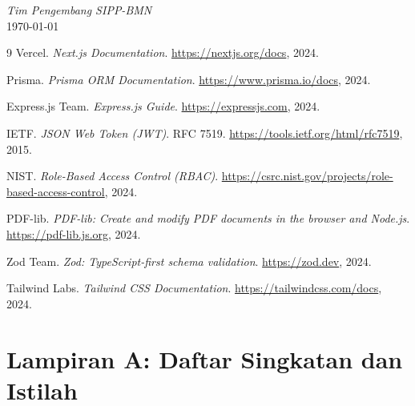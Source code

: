 \documentclass[
  12pt,
  a4paper,
  oneside,
  final
]{report}
\begin{document}
\begin{flushright}
  \textit{Tim Pengembang SIPP-BMN} \\[4pt]
  \today
\end{flushright}

\clearpage
{}

\begin{thebibliography}{9}
    Vercel. \textit{Next.js Documentation}.
    \url{https://nextjs.org/docs}, 2024.

    Prisma. \textit{Prisma ORM Documentation}.
    \url{https://www.prisma.io/docs}, 2024.

    Express.js Team. \textit{Express.js Guide}.
    \url{https://expressjs.com}, 2024.

    IETF. \textit{JSON Web Token (JWT)}.
    RFC 7519. \url{https://tools.ietf.org/html/rfc7519}, 2015.

    NIST. \textit{Role-Based Access Control (RBAC)}.
    \url{https://csrc.nist.gov/projects/role-based-access-control}, 2024.

    PDF-lib. \textit{PDF-lib: Create and modify PDF documents in the browser and Node.js}.
    \url{https://pdf-lib.js.org}, 2024.

    Zod Team. \textit{Zod: TypeScript-first schema validation}.
    \url{https://zod.dev}, 2024.

    Tailwind Labs. \textit{Tailwind CSS Documentation}.
    \url{https://tailwindcss.com/docs}, 2024.
\end{thebibliography}

\clearpage
{}

\chapter*{Lampiran A: Daftar Singkatan dan Istilah}
\end{document}
